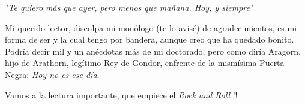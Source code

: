 \begin{center}
\textit{"Te quiero más que ayer, pero menos que mañana. Hoy, y siempre"}
\end{center}

Mi querido lector, disculpa mi monólogo (te lo avisé) de agradecimientos, es mi forma de ser y la cual tengo por bandera, aunque creo que ha quedado bonito. Podría decir mil y un anécdotas más de mi doctorado, pero como diría Aragorn, hijo de Arathorn, legítimo Rey de Gondor, enfrente de la mismísima Puerta Negra: \textit{Hoy no es ese día}. 

Vamos a la lectura importante, que empiece el \textit{Rock and Roll} !!


